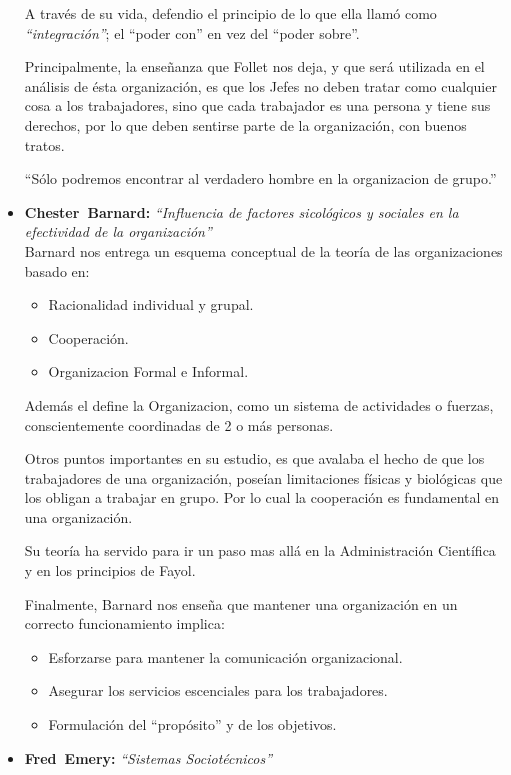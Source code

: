 \begin{itemize}
	A través de su vida,
	defendio el principio de lo que ella llamó como \emph{``integración''};
	el ``poder con'' en vez del ``poder sobre''.
	
	Principalmente,
	la enseñanza que Follet nos deja,
	y que será utilizada en el análisis de ésta organización,
	es que los Jefes no deben tratar como cualquier cosa a los trabajadores,
	sino que cada trabajador es una persona y tiene sus derechos,
	por lo que deben sentirse parte de la organización,
	con buenos tratos.

	``Sólo podremos encontrar al verdadero hombre en la organizacion de grupo.''
	
	\item \textbf{Chester\ Barnard:} \emph{``Influencia de factores sicológicos y sociales en la efectividad de la organización''}\\
	Barnard nos entrega un esquema conceptual
	de la teoría de las organizaciones basado en:
	\begin{itemize}
		\item Racionalidad individual y grupal.
		\item Cooperación.
		\item Organizacion Formal e Informal.
	\end{itemize}

	Además el define la Organizacion, 
	como un sistema de actividades o fuerzas,
	conscientemente coordinadas de 2 o más personas.

	Otros puntos importantes en su estudio,
	es que avalaba el hecho de que los trabajadores de una organización,
	poseían limitaciones físicas y biológicas que los obligan a trabajar en grupo.
	Por lo cual la cooperación es fundamental en una organización.

	Su teoría ha servido para ir un paso mas allá
	en la Administración Científica y en los principios de Fayol.

	Finalmente,
	Barnard nos enseña que mantener una organización en un correcto funcionamiento implica:
	\begin{itemize}	
		\item Esforzarse para mantener la comunicación organizacional.
		\item Asegurar los servicios escenciales para los trabajadores.
		\item Formulación del ``propósito'' y de los objetivos.
	\end{itemize}

	\item \textbf{Fred\ Emery:} \emph{ ``Sistemas Sociotécnicos''}\\
	

\end{itemize}
